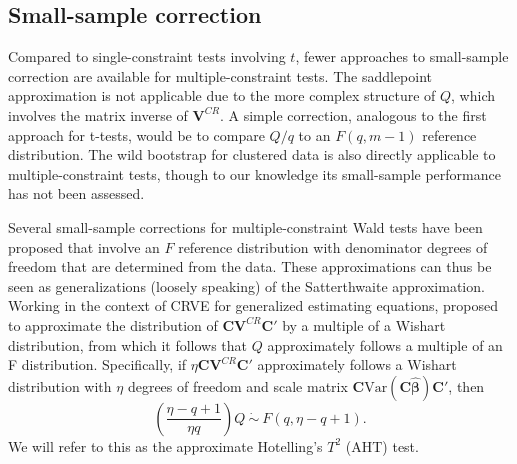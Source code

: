 \documentclass[12pt]{article}\usepackage[]{graphicx}\usepackage[]{color}
\newcommand{\Var}{\text{Var}}
\newcommand{\bm}{\mathbf}
\newcommand{\bs}{\boldsymbol}
\begin{document}
\subsection{Small-sample correction}

Compared to single-constraint tests involving $t$, fewer approaches to small-sample correction are available for multiple-constraint tests. 
The saddlepoint approximation is not applicable due to the more complex structure of $Q$, which involves the matrix inverse of $\bm{V}^{CR}$. 
A simple correction, analogous to the first approach for t-tests, would be to compare $Q / q$ to an $F(q, m - 1)$ reference distribution. 
The wild bootstrap for clustered data \citep{Webb2013wild} is also directly applicable to multiple-constraint tests, though to our knowledge its small-sample performance has not been assessed. 

Several small-sample corrections for multiple-constraint Wald tests have been proposed that involve an $F$ reference distribution with denominator degrees of freedom that are determined from the data. 
These approximations can thus be seen as generalizations (loosely speaking) of the Satterthwaite approximation. 
Working in the context of CRVE for generalized estimating equations, \cite{Pan2002small} proposed to approximate the distribution of $\bm{C}\bm{V}^{CR} \bm{C}'$ by a multiple of a Wishart distribution, from which it follows that $Q$ approximately follows a multiple of an F distribution. 
Specifically, if $\eta \bm{C}\bm{V}^{CR} \bm{C}'$ approximately follows a Wishart distribution with $\eta$ degrees of freedom and scale matrix $\bm{C} \Var\left(\bm{C}\bs{\hat\beta}\right)\bm{C}'$, then 
\begin{equation}
\label{eq:AHT}
\left(\frac{\eta - q + 1}{\eta q}\right) Q \ \dot\sim \ F(q, \eta - q + 1).
\end{equation}
We will refer to this as the approximate Hotelling's $T^2$ (AHT) test.
\end{document}
